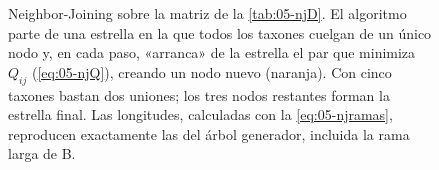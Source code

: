 \begin{figure}[t]
\caption[Los pasos de Neighbor-Joining]{Neighbor-Joining sobre la matriz de la \cref{tab:05-njD}. El algoritmo parte de una estrella en la que todos los taxones cuelgan de un único nodo y, en cada paso, «arranca» de la estrella el par que minimiza $Q_{ij}$ (\cref{eq:05-njQ}), creando un nodo nuevo (naranja). Con cinco taxones bastan dos uniones; los tres nodos restantes forman la estrella final. Las longitudes, calculadas con la \cref{eq:05-njramas}, reproducen exactamente las del árbol generador, incluida la rama larga de B.}
\label{fig:05-njpasos}
\end{figure}

